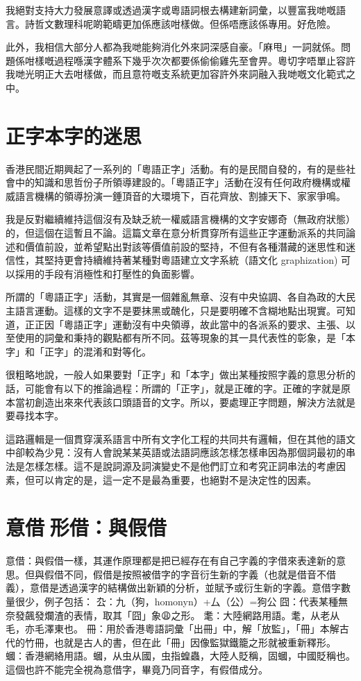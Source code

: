 我絕對支持大力發展意譯或透過漢字或粵語詞根去構建新詞彙，以豐富我哋嘅語言。詩哲文數理科呢啲範疇更加係應該咁樣做。但係唔應該係專用。好危險。

此外，我相信大部分人都為我哋能夠消化外來詞深感自豪。「麻甩」一詞就係。問題係咁樣嘅過程喺漢字體系下幾乎次次都要係偷偷雞先至會畀。粵切字唔單止容許我哋光明正大去咁樣做，而且意符嘅支系統更加容許外來詞融入我哋嘅文化範式之中。





\section{正字本字的迷思}

香港民間近期興起了一系列的「粵語正字」活動。有的是民間自發的，有的是些社會中的知識和思哲份子所領導建設的。「粵語正字」活動在沒有任何政府機構或權威語言機構的領導扮演一錘頂音的大環境下，百花齊放、割據天下、家家爭鳴。

我是反對繼續維持這個沒有及缺乏統一權威語言機構的文字安娜奇（無政府狀態）的，但這個在這暫且不論。這篇文章在意分析貫穿所有這些正字運動派系的共同論述和價值前設，並希望點出對該等價值前設的堅持，不但有各種潛藏的迷思性和迷信性，其堅持更會持續維持著某種對粵語建立文字系統（語文化 graphization) 可以採用的手段有消極性和打壓性的負面影響。

所謂的「粵語正字」活動，其實是一個雜亂無章、沒有中央協調、各自為政的大民主語言運動。這樣的文字不是要抹黑或醜化，只是要明確不含糊地點出現實。可知道，正正因「粵語正字」運動沒有中央領導，故此當中的各派系的要求、主張、以至使用的詞彙和秉持的觀點都有所不同。茲等現象的其一具代表性的彰象，是「本字」和「正字」的混淆和對等化。

很粗略地說，一般人如果要對「正字」和「本字」做出某種按照字義的意思分析的話，可能會有以下的推論過程：所謂的「正字」，就是正確的字。正確的字就是原本當初創造出來來代表該口頭語音的文字。所以，要處理正字問題，解決方法就是要尋找本字。

這路邏輯是一個貫穿漢系語言中所有文字化工程的共同共有邏輯，但在其他的語文中卻較為少見：沒有人會說某某英語或法語詞應該怎樣怎樣串因為那個詞最初的串法是怎樣怎樣。這不是說詞源及詞演變史不是他們訂立和考究正詞串法的考慮因素，但可以肯定的是，這一定不是最為重要，也絕對不是決定性的因素。




\section{意借形借：與假借}
意借：與假借一樣，其運作原理都是把已經存在有自己字義的字借來表達新的意思。但與假借不同，假借是按照被借字的字音衍生新的字義（也就是借音不借義），意借是透過漢字的結構做出新穎的分析，並賦予或衍生新的字義。意借字數量很少，例子包括：
厹：九（狗，homonyn）+厶（公）=狗公
囧：代表某種無奈發飆發爛渣的表情，取其「囧」象😩之形。
耄：大陸網路用語。耄，从老从毛，亦毛澤東也。
冊：用於香港粵語詞彙「出冊」中，解「放監」，「冊」本解古代的竹冊，也就是古人的書，但在此「冊」因像監獄鐵籠之形就被重新釋形。
蟈：香港網絡用語。蟈，从虫从國，虫指蝗蟲，大陸人貶稱，固蟈，中國貶稱也。這個也許不能完全視為意借字，畢竟乃同音字，有假借成分。

